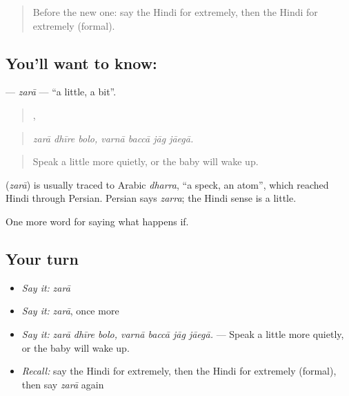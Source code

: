 \begin{quote}
Before the new one: say the Hindi for extremely, then the Hindi for extremely (formal).
\end{quote}

\subsection*{You'll want to know: }
\textbf{} — \emph{zarā} — \textquotedblleft{}a little, a bit\textquotedblright{}.

\begin{quote}
  ,    
\end{quote}

\begin{quote}
\emph{zarā dhīre bolo, varnā baccā jāg jāegā.}
\end{quote}

\begin{quote}
Speak a little more quietly, or the baby will wake up.
\end{quote}

\begin{cousinweb}
\textbf{} (\emph{zarā}) is usually traced to Arabic \emph{dharra}, \textquotedblleft{}a speck, an atom\textquotedblright{}, which reached Hindi through Persian. Persian says \emph{zarra}; the Hindi sense is a little.
\end{cousinweb}

\begin{grammarlens}[title={What you've built}]
One more word for saying what happens if.
\end{grammarlens}

\subsection*{Your turn}
\begin{itemize}
\raggedright
  \item \emph{Say it:} \emph{zarā}
  \item \emph{Say it:} \emph{zarā}, once more
  \item \emph{Say it:} \emph{zarā dhīre bolo, varnā baccā jāg jāegā.} — Speak a little more quietly, or the baby will wake up.
  \item \emph{Recall:} say the Hindi for extremely, then the Hindi for extremely (formal), then say \emph{zarā} again
\end{itemize}

